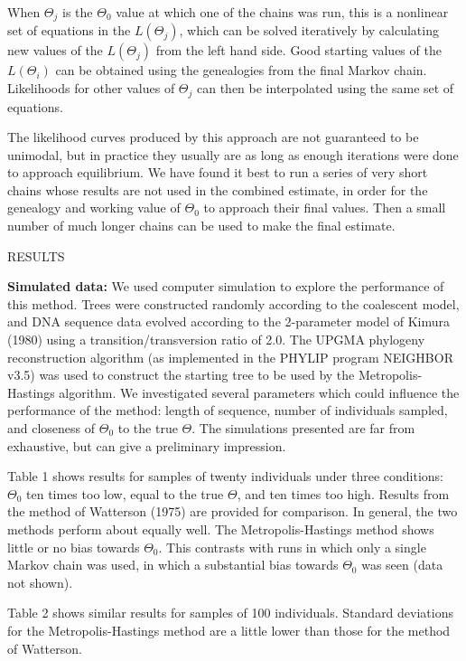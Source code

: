 \documentclass[12pt]{article}
\begin{document}
When $\Theta_j$ is the $\Theta_0$ value at which one of the chains was
run, this is a nonlinear set of equations in the $L(\Theta_{j})$, which can
be solved iteratively by calculating new values of the $L(\Theta_{j})$
from the left hand side.  
Good starting values of the $L(\Theta_{i})$ can be obtained using the 
genealogies from the final Markov chain.  Likelihoods for other values
of $\Theta_j$ can then be interpolated using the same set of equations.

The likelihood curves produced by this approach are not guaranteed to be
unimodal, but in practice they usually are as long as enough iterations
were done to approach equilibrium.  We have found it best to run a
series of very short chains whose results are not used in the combined
estimate, in order for the genealogy and working value of $\Theta_0$ to
approach their final values.  Then a small number of much longer chains
can be used to make the final estimate.

\bigskip
\begin{center}RESULTS
\end{center}
\bigskip

{\bf Simulated data:}  We used computer simulation to explore the 
performance of this method.
Trees were constructed randomly according to the coalescent model, and DNA
sequence data evolved according to the 2-parameter model of {\sc Kimura} (1980)
using a transition/transversion ratio of 2.0. 
The UPGMA phylogeny reconstruction algorithm (as implemented in the PHYLIP
program NEIGHBOR v3.5) was used to construct
the starting tree to be used by the Metropolis-Hastings algorithm.
We investigated several parameters which could influence the performance
of the method:  length of sequence, number of individuals sampled, and
closeness of $\Theta_0$ to the true $\Theta$.
The simulations presented are far from exhaustive,
but can give a preliminary impression.

Table 1 shows results for samples of twenty individuals under three
conditions:  $\Theta_0$ ten times too low, equal to the true $\Theta$,
and ten times too high.  Results from the method of {\sc Watterson} (1975)
are provided for comparison.  In general, the two methods perform
about equally well.  The Metropolis-Hastings method shows little or no
bias towards $\Theta_0$.
This contrasts with runs in which only a single Markov chain was used,
in which a substantial bias towards $\Theta_0$ was seen (data not
shown).

Table 2 shows similar results for samples of 100 individuals.  Standard
deviations for the Metropolis-Hastings method are a little lower than
those for the method of Watterson.
\end{document}
